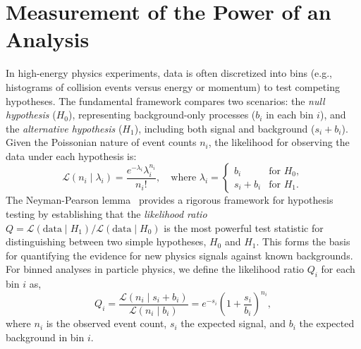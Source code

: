 \section{Measurement of the Power of an Analysis}
\label{sec:power_analysis}

In high-energy physics experiments, data is often discretized into bins (e.g., histograms of collision events versus energy or momentum) to test competing hypotheses. The fundamental framework compares two scenarios: the \textit{null hypothesis} ($H_0$), representing background-only processes ($b_i$ in each bin $i$), and the \textit{alternative hypothesis} ($H_1$), including both signal and background ($s_i + b_i$). Given the Poissonian nature of event counts $n_i$, the likelihood for observing the data under each hypothesis is:
\begin{equation}
    \mathcal{L}(n_i \mid \lambda_i) = \frac{e^{-\lambda_i} \lambda_i^{n_i}}{n_i!}, \quad \text{where } \lambda_i = 
    \begin{cases}
        b_i & \text{for } H_0, \\
        s_i + b_i & \text{for } H_1.
    \end{cases}
\end{equation}
The Neyman-Pearson lemma~\parencite{NeymanPearson1933} provides a rigorous framework for hypothesis testing by establishing that the \textit{likelihood ratio} $Q = \mathcal{L}(\text{data} \mid H_1)/\mathcal{L}(\text{data} \mid H_0)$ is the most powerful test statistic for distinguishing between two simple hypotheses, $H_0$ and $H_1$. This forms the basis for quantifying the evidence for new physics signals against known backgrounds. For binned analyses in particle physics, we define the likelihood ratio $Q_i$ for each bin $i$ as,
\begin{equation}
Q_i = \frac{\mathcal{L}(n_i \mid s_i + b_i)}{\mathcal{L}(n_i \mid b_i)} = e^{-s_i} \left( 1+\frac{s_i}{b_i} \right)^{n_i},
\end{equation}
where $n_i$ is the observed event count, $s_i$ the expected signal, and $b_i$ the expected background in bin $i$. 


